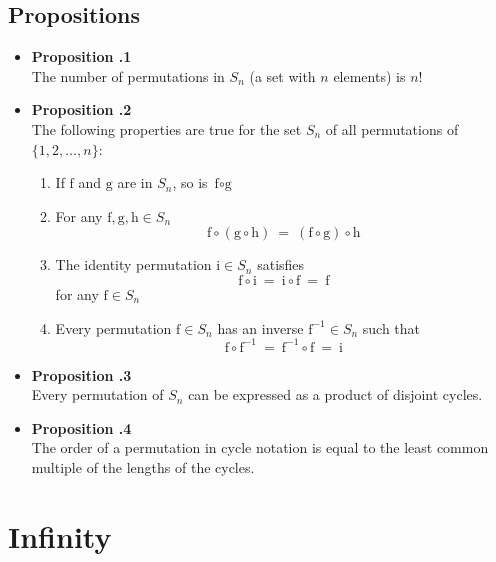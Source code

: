 \documentclass[a4paper,12pt]{article}
\newcommand{\prop}[1]{
    \item \textbf{Proposition \thesection.#1}\\
}
\begin{document}
\subsection{Propositions}
\begin{itemize}
    \prop 1
    The number of permutations in $S_n$ (a set with $n$ elements) is $n!$
    
    \prop 2
    The following properties are true for the set $S_n$ of all permutations of
    $\{1, 2, \ldots, n\}$:
    \begin{enumerate}
        \item If $\text{f}$ and $\text{g}$ are in $S_n$, so is $\text{f} \circ \text{g}$
        \item For any $\text{f}, \text{g}, \text{h} \in S_n$
            $$ \text{f} \circ (\text{g} \circ \text{h})\ =\ (\text{f} \circ \text{g}) \circ \text{h} $$
        \item The identity permutation $\text{i} \in S_n$ satisfies
            $$ \text{f} \circ \text{i}\ =\ \text{i} \circ \text{f}\ =\ \text{f} $$
            for any $\text{f} \in S_n$
        \item Every permutation $\text{f} \in S_n$ has an inverse $\text{f}^{-1} \in S_n$
            such that
            $$ \text{f} \circ \text{f}^{-1}\ =\ \text{f}^{-1} \circ \text{f}\ =\ \text{i} $$
    \end{enumerate}
    
    \prop 3
    Every permutation of $S_n$ can be expressed as a product of disjoint cycles.
    
    \prop 4
    The order of a permutation in cycle notation is equal to the least common multiple of
    the lengths of the cycles.
\end{itemize}

\section{Infinity}
\end{document}
